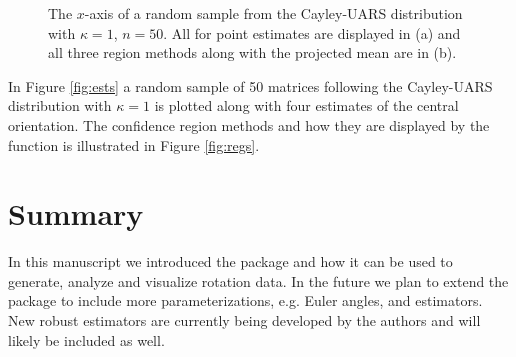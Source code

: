 \begin{figure}[h]
	\caption{\label{figure:eye1}The $x$-axis of a random sample from the Cayley-UARS distribution with $\kappa=1$, $n=50$.  All for point estimates are displayed in (a) and all three region methods along with the projected mean are in (b).}
	
\end{figure}

In Figure \ref{fig:ests} a random sample of 50 matrices following the Cayley-UARS distribution with $\kappa=1$ is plotted along with four estimates of the central orientation.  The confidence region methods and how they are displayed by the  function is illustrated in Figure \ref{fig:regs}.

\section{Summary}

In this manuscript we introduced the  package and how it can be used to generate, analyze and visualize rotation data.  In the future we plan to extend the  package to include more parameterizations, e.g. Euler angles, and estimators.  New robust estimators are currently being developed by the authors and will likely be included as well.  




\address{Bryan Stanfill\\
  Department of Statistics\\
  Iowa State University\\
  Ames, IA 50011}\\

\address{Heike Hofmann\\
  Department of Statistics\\
  Iowa State University\\
  Ames, IA 50011}\\

\address{Ulrike Genschel\\
  Department of Statistics\\
  Iowa State University\\
  Ames, IA 50011}\\
